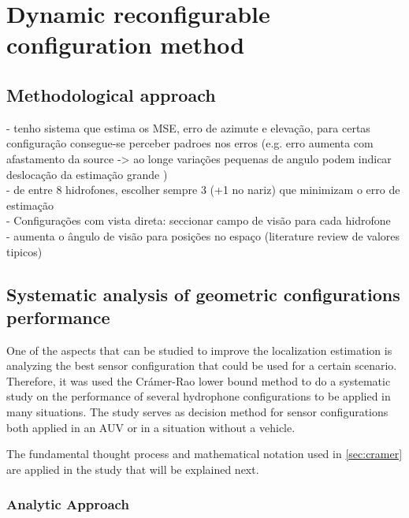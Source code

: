 \chapter{Dynamic reconfigurable configuration method}  \label{chap:study}


\section{Methodological approach} \label{sec:config-perf}

- tenho sistema que estima os MSE, erro de azimute e elevação, para certas configuração consegue-se perceber padroes nos erros (e.g. erro aumenta com afastamento da source -> ao longe variações pequenas de angulo podem indicar deslocação da estimação grande )
\\
- de entre 8 hidrofones, escolher sempre 3 (+1 no nariz) que minimizam o erro de estimação
\\
- Configurações com vista direta: seccionar campo de visão para cada hidrofone
\\
- aumenta o ângulo de visão para posições no espaço (literature review de valores tipicos)

\section{Systematic analysis of geometric configurations performance} \label{sec:config-perf}

One of the aspects that can be studied to improve the localization estimation is analyzing the best sensor configuration that could be used for a certain scenario. Therefore, it was used the Crámer-Rao lower bound method to do a systematic study on the performance of several hydrophone configurations to be applied in many situations. The study serves as decision method for sensor configurations both applied in an AUV or in a situation without a vehicle. 

The fundamental thought process and mathematical notation used in \ref{sec:cramer} are applied in the study that will be explained next.

\subsection{Analytic Approach}  

